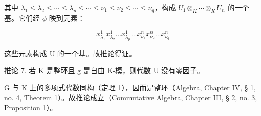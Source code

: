 其中 \(\lambda_{1}\leqslant\lambda_{2}\leqslant\cdots\leqslant\lambda_{p}\leqslant\cdots\leqslant\nu_{1}\leqslant\nu_{2}\leqslant\cdots\leqslant\nu_{q}\)，构成 \(U_{1}\otimes_{K}\cdots\otimes_{K}U_{n}\) 的一个基。它们经 \(\phi\) 映到元素：

\[
x _ {\lambda_ {1}} ^ {1} x _ {\lambda_ {2}} ^ {1} \dots x _ {\lambda_ {p}} ^ {1} \dots x _ {\nu_ {1}} ^ {n} x _ {\nu_ {2}} ^ {n} \dots x _ {\nu_ {q}} ^ {n}
\]

这些元素构成 U 的一个基。故推论得证。

推论 7. 若 K 是整环且 g 是自由 K-模，则代数 U 没有零因子。

G 与 K 上的多项式代数同构（定理 1），因而是整环（Algebra, Chapter IV, § 1, no. 4, Theorem 1）。故推论成立（Commutative Algebra, Chapter III, § 2, no. 3, Proposition 1）。

